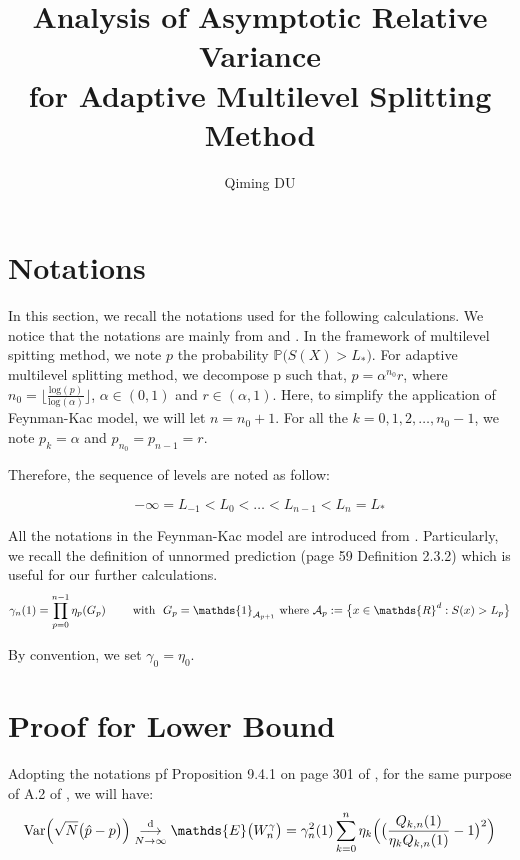 \documentclass[a4paper,10pt]{article}
\title{Analysis of Asymptotic Relative Variance\\ for Adaptive Multilevel Splitting Method}
\author{Qiming DU}
\date{}
\begin{document}
\maketitle
\vspace{3cm}
\section{Notations}

In this section, we recall the notations used for the following calculations.
We notice that the notations are mainly from \cite{cerou2014fluctuation} 
and \cite{cerou2012}. In the framework of multilevel spitting method, 
we note $p$ the probability $\mathds{P}\big(S(X) > L_*\big)$. 
For adaptive multilevel splitting method, we decompose p such that,
$ p = \alpha^{n_0}r$, where $n_0 = \big\lfloor \frac{\mathrm{log}(p)}{\mathrm{log}(\alpha)} \big\rfloor$, $\alpha \in (0,1)$ and $r \in (\alpha,1)$.
Here, to simplify the application of Feynman-Kac model, we will let $n = n_0 + 1$. For all the $k = 0,1,2,\dots,n_0-1$, we note $p_k = \alpha$ and $p_{n_0} =p_{n-1} = r$.

Therefore, the sequence of levels are noted as follow: 

$$ -\infty = L_{-1} < L_0 < \dots < L_{n-1} < L_n = L_*$$

All the notations in the Feynman-Kac model are introduced from \cite{del2004feynman}.
Particularly, we recall the definition of unnormed prediction (page 59 Definition 2.3.2)
\cite{del2004feynman} which is useful for our further calculations.
$$\gamma_n(1) = \prod_{p = 0 }^{n-1} \eta_p(G_p) \text{ \qquad with \ }
G_p = \mathds{1}_{\mathcal{A}_{p+1}} 
\ \text{where}\ \mathcal{A}_p := \big\{ x \in \mathds{R}^d : S(x) > L_p \big\}$$

By convention, we set $\gamma_0 = \eta_0$.

\section{Proof for Lower Bound}
Adopting the notations pf Proposition 9.4.1 on page 301 of \cite{del2004feynman}, for the same purpose of A.2 of \cite{cerou2012}, we will have:
\begin{equation*}
\mathrm{Var}\Big(\sqrt{N}\big(\hat p - p\big)\Big) 
\underset{N \to \infty}{\overset{\mathrm{d}}{\longrightarrow}}
 \mathds{E}\big(W_n^{\gamma}\big) \\ 
= \gamma_{n}^2(1) \sum_{k = 0}^{n} \eta_k\Big(\big(\frac{Q_{k,n}(1)}{\eta_k Q_{k,n}(1)} - 1\big)^2\Big)
\end{equation*}
\end{document}
